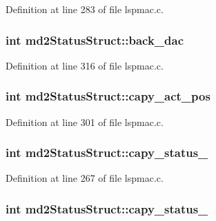 Definition at line 283 of file lspmac.\-c.

\hypertarget{structmd2StatusStruct_a33ce490348c8de255cf49b96469d3d4e}{
\subsubsection[{back\-\_\-dac}]{\setlength{\rightskip}{0pt plus 5cm}int md2\-Status\-Struct\-::back\-\_\-dac}}\label{structmd2StatusStruct_a33ce490348c8de255cf49b96469d3d4e}


Definition at line 316 of file lspmac.\-c.

\hypertarget{structmd2StatusStruct_ae25122a6db146501b51609b9cb59b044}{
\subsubsection[{capy\-\_\-act\-\_\-pos}]{\setlength{\rightskip}{0pt plus 5cm}int md2\-Status\-Struct\-::capy\-\_\-act\-\_\-pos}}\label{structmd2StatusStruct_ae25122a6db146501b51609b9cb59b044}


Definition at line 301 of file lspmac.\-c.

\hypertarget{structmd2StatusStruct_a7f4e945e80b1980b9e69366a69ad79cc}{
\subsubsection[{capy\-\_\-status\-\_\-1}]{\setlength{\rightskip}{0pt plus 5cm}int md2\-Status\-Struct\-::capy\-\_\-status\-\_}}\label{structmd2StatusStruct_a7f4e945e80b1980b9e69366a69ad79cc}


Definition at line 267 of file lspmac.\-c.

\hypertarget{structmd2StatusStruct_a5d7c10d9a16ebcc53ac4a0770ab2ef62}{
\subsubsection[{capy\-\_\-status\-\_\-2}]{\setlength{\rightskip}{0pt plus 5cm}int md2\-Status\-Struct\-::capy\-\_\-status\-\_}}\label{structmd2StatusStruct_a5d7c10d9a16ebcc53ac4a0770ab2ef62}


